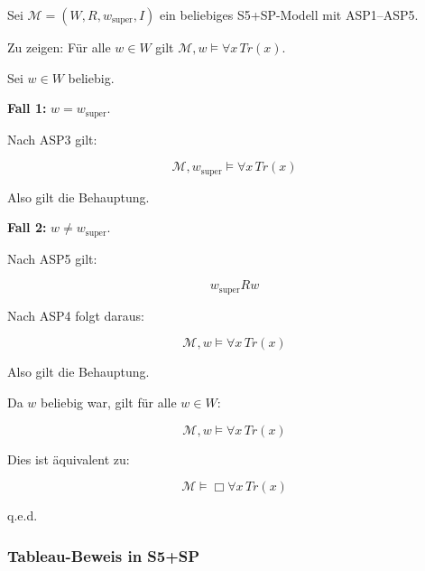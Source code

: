 \documentclass[
]{article}
\begin{document}
Sei \(\mathcal{M} = (W, R, w_{\text{super}}, I)\) ein beliebiges S5+SP-Modell mit ASP1–ASP5.

Zu zeigen: Für alle \(w \in W\) gilt \(\mathcal{M}, w \models \forall x\,Tr(x)\).

Sei \(w \in W\) beliebig.

\textbf{Fall 1:} \(w = w_{\text{super}}\).

Nach ASP3 gilt:

\[
\mathcal{M}, w_{\text{super}} \models \forall x\,Tr(x)
\]

Also gilt die Behauptung.

\textbf{Fall 2:} \(w \neq w_{\text{super}}\).

Nach ASP5 gilt:

\[
w_{\text{super}} R w
\]

Nach ASP4 folgt daraus:

\[
\mathcal{M}, w \models \forall x\,Tr(x)
\]

Also gilt die Behauptung.

Da \(w\) beliebig war, gilt für alle \(w \in W\):

\[
\mathcal{M}, w \models \forall x\,Tr(x)
\]

Dies ist äquivalent zu:

\[
\mathcal{M} \models \Box\forall x\,Tr(x)
\]

q.e.d.

\subsubsection{Tableau-Beweis in S5+SP}
\end{document}
